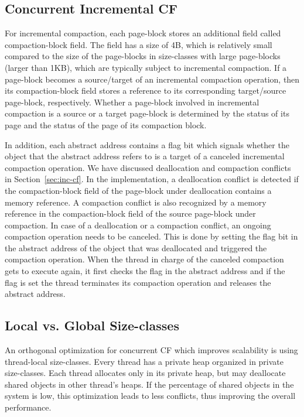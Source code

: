 \documentclass{amsart}
\begin{document}
\subsection{Concurrent Incremental CF}\label{subsec:conc-inc-cf}

For incremental compaction, each page-block stores an additional field
called compaction-block field.  The field has a size of 4B, which is
relatively small compared to the size of the page-blocks in
size-classes with large page-blocks (larger than 1KB), which are
typically subject to incremental compaction.  If a page-block becomes
a source/target of an incremental compaction operation, then its
compaction-block field stores a reference to its corresponding
target/source page-block, respectively.  Whether a page-block involved
in incremental compaction is a source or a target page-block is
determined by the status of its page and the status of the page of its
compaction block.

In addition, each abstract address contains a flag bit which signals
whether the object that the abstract address refers to is a target of
a canceled incremental compaction operation.  We have discussed
deallocation and compaction conflicts in Section~\ref{sec:inc-cf}.  In
the implementation, a deallocation conflict is detected if the
compaction-block field of the page-block under deallocation contains a
memory reference.  A compaction conflict is also recognized by a
memory reference in the compaction-block field of the source
page-block under compaction.  In case of a deallocation or a
compaction conflict, an ongoing compaction operation needs to be
canceled.  This is done by setting the flag bit in the abstract
address of the object that was deallocated and triggered the
compaction operation.  When the thread in charge of the canceled
compaction gets to execute again, it first checks the flag in the
abstract address and if the flag is set the thread terminates its
compaction operation and releases the abstract address.

\subsection{Local vs. Global Size-classes}\label{subsec:local-global}

An orthogonal optimization for concurrent CF which improves
scalability is using thread-local size-classes.  Every thread has a
private heap organized in private size-classes.  Each thread allocates
only in its private heap, but may deallocate shared objects in other
thread's heaps.  If the percentage of shared objects in the system is
low, this optimization leads to less conflicts, thus improving the
overall performance.
\end{document}
